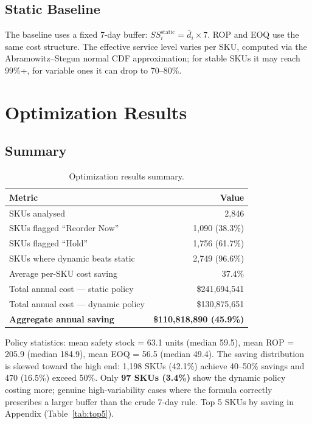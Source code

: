 \documentclass[11pt,letterpaper]{article}
\begin{document}
\subsection{Static Baseline}

The baseline uses a fixed 7-day buffer: $SS_i^{\text{static}} = \bar{d}_i \times 7$. ROP and EOQ use the same cost structure. The effective service level varies per SKU, computed via the Abramowitz--Stegun normal CDF approximation; for stable SKUs it may reach 99\%+, for variable ones it can drop to 70--80\%.


\section{Optimization Results}
\label{sec:opt-results}

\subsection{Summary}

\begin{table}[H]
\centering
\caption{Optimization results summary.}
\label{tab:opt-summary}
\small
\begin{tabular}{@{}lr@{}}
\toprule
\textbf{Metric} & \textbf{Value} \\
\midrule
SKUs analysed & 2,846 \\
SKUs flagged ``Reorder Now'' & 1,090 (38.3\%) \\
SKUs flagged ``Hold'' & 1,756 (61.7\%) \\
SKUs where dynamic beats static & 2,749 (96.6\%) \\
Average per-SKU cost saving & 37.4\% \\
Total annual cost --- static policy & \$241,694,541 \\
Total annual cost --- dynamic policy & \$130,875,651 \\
\textbf{Aggregate annual saving} & \textbf{\$110,818,890 (45.9\%)} \\
\bottomrule
\end{tabular}
\end{table}

Policy statistics: mean safety stock = 63.1 units (median 59.5), mean ROP = 205.9 (median 184.9), mean EOQ = 56.5 (median 49.4). The saving distribution is skewed toward the high end: 1,198 SKUs (42.1\%) achieve 40--50\% savings and 470 (16.5\%) exceed 50\%. Only \textbf{97 SKUs (3.4\%)} show the dynamic policy costing more; genuine high-variability cases where the formula correctly prescribes a larger buffer than the crude 7-day rule. Top 5 SKUs by saving in Appendix (Table~\ref{tab:top5}).
\end{document}
